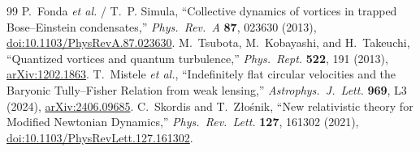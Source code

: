 \documentclass[11pt,letterpaper]{article}
\begin{document}
\begin{thebibliography}{99}
 P.~Fonda \emph{et al.} / T.~P. Simula, ``Collective dynamics of vortices in trapped Bose--Einstein condensates,'' \emph{Phys.\ Rev.\ A} \textbf{87}, 023630 (2013), \href{https://link.aps.org/doi/10.1103/PhysRevA.87.023630}{doi:10.1103/PhysRevA.87.023630}.
 M.~Tsubota, M.~Kobayashi, and H.~Takeuchi, ``Quantized vortices and quantum turbulence,'' \emph{Phys.\ Rept.} \textbf{522}, 191 (2013), \href{https://arxiv.org/html/1202.1863v1}{arXiv:1202.1863}.
 T.~Mistele \emph{et al.}, ``Indefinitely flat circular velocities and the Baryonic Tully--Fisher Relation from weak lensing,'' \emph{Astrophys.\ J.\ Lett.} \textbf{969}, L3 (2024), \href{https://arxiv.org/abs/2406.09685}{arXiv:2406.09685}.
 C.~Skordis and T.~Z\l{}o\'snik, ``New relativistic theory for Modified Newtonian Dynamics,'' \emph{Phys.\ Rev.\ Lett.} \textbf{127}, 161302 (2021), \href{https://link.aps.org/doi/10.1103/PhysRevLett.127.161302}{doi:10.1103/PhysRevLett.127.161302}.
\end{thebibliography}
\end{document}
